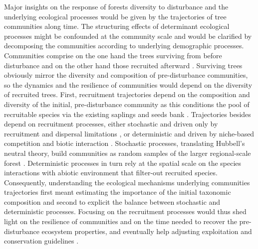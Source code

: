 \documentclass[fleqn,10pt]{ArtEcoFoG} %
\begin{document}
Major insights on the response of forests diversity to disturbance and
the underlying ecological processes would be given by the trajectories
of tree communities along time. The structuring effects of determinant
ecological processes might be confounded at the community scale
\citep{Chave2004} and would be clarified by decomposing the communities
according to underlying demographic processes. Communities comprise on
the one hand the trees surviving from before disturbance and on the
other hand those recruited afterward \citep{Herault2018}. Surviving
trees obviously mirror the diversity and composition of pre-disturbance
communities, so the dynamics and the resilience of communities would
depend on the diversity of recruited trees. First, recruitment
trajectories depend on the composition and diversity of the initial,
pre-disturbance community as this conditions the pool of recruitable
species via the existing saplings and seeds bank \citep{Herault2018}.
Trajectories besides depend on recruitment processes, either stochastic
and driven only by recruitment and dispersal limitations
\citep{Hurtt1995, Hubbell2001}, or deterministic and driven by
niche-based competition and biotic interaction \citep{Adler2007}.
Stochastic processes, translating Hubbell's neutral theory, build
communities as random samples of the larger regional-scale forest
\citep{Hubbell2001, Chave2004}. Deterministic processes in turn rely at
the spatial scale on the species interactions with abiotic environment
that filter-out recruited species. Consequently, understanding the
ecological mechanisms underlying communities trajectories first meant
estimating the importance of the initial taxonomic composition and
second to explicit the balance between stochastic and deterministic
processes. Focusing on the recruitment processes would thus shed light
on the resilience of communities and on the time needed to recover the
pre-disturbance ecosystem properties, and eventually help adjusting
exploitation and conservation guidelines
\citep{Diaz2005, Gardner2007, Schwartz2017}.
\end{document}
